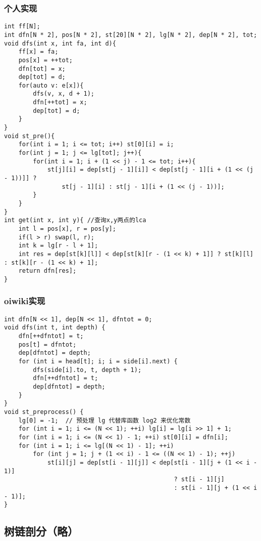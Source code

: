 \subsubsection{个人实现}
\begin{lstlisting}
int ff[N];
int dfn[N * 2], pos[N * 2], st[20][N * 2], lg[N * 2], dep[N * 2], tot;
void dfs(int x, int fa, int d){
    ff[x] = fa;
    pos[x] = ++tot;
    dfn[tot] = x;
    dep[tot] = d;
    for(auto v: e[x]){
        dfs(v, x, d + 1);
        dfn[++tot] = x;
        dep[tot] = d;
    }
}
void st_pre(){
    for(int i = 1; i <= tot; i++) st[0][i] = i;
    for(int j = 1; j <= lg[tot]; j++){
        for(int i = 1; i + (1 << j) - 1 <= tot; i++){
            st[j][i] = dep[st[j - 1][i]] < dep[st[j - 1][i + (1 << (j - 1))]] ? 
                st[j - 1][i] : st[j - 1][i + (1 << (j - 1))];
        }
    }
}
int get(int x, int y){ //查询x,y两点的lca
    int l = pos[x], r = pos[y];
    if(l > r) swap(l, r);
    int k = lg[r - l + 1];
    int res = dep[st[k][l]] < dep[st[k][r - (1 << k) + 1]] ? st[k][l] : st[k][r - (1 << k) + 1];
    return dfn[res];
}
\end{lstlisting}
\subsubsection{oiwiki实现}
\begin{lstlisting}
int dfn[N << 1], dep[N << 1], dfntot = 0;
void dfs(int t, int depth) {
    dfn[++dfntot] = t;
    pos[t] = dfntot;
    dep[dfntot] = depth;
    for (int i = head[t]; i; i = side[i].next) {
        dfs(side[i].to, t, depth + 1);
        dfn[++dfntot] = t;
        dep[dfntot] = depth;
    }
}
void st_preprocess() {
    lg[0] = -1;  // 预处理 lg 代替库函数 log2 来优化常数
    for (int i = 1; i <= (N << 1); ++i) lg[i] = lg[i >> 1] + 1;
    for (int i = 1; i <= (N << 1) - 1; ++i) st[0][i] = dfn[i];
    for (int i = 1; i <= lg[(N << 1) - 1]; ++i)
        for (int j = 1; j + (1 << i) - 1 <= ((N << 1) - 1); ++j)
            st[i][j] = dep[st[i - 1][j]] < dep[st[i - 1][j + (1 << i - 1)]
                                               ? st[i - 1][j]
                                               : st[i - 1][j + (1 << i - 1)];
}
\end{lstlisting}

\subsection{树链剖分（略）}